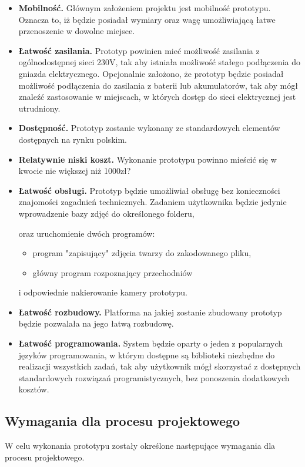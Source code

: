 \documentclass[a4paper,12pt,reqno]{article}
\begin{document}
\begin{itemize}
	\item \textbf{Mobilność.} Głównym założeniem projektu jest mobilność prototypu. Oznacza to, iż będzie posiadał wymiary oraz wagę umożliwiającą łatwe przenoszenie w dowolne miejsce.
	\item \textbf{Łatwość zasilania.} Prototyp powinien mieć możliwość zasilania z ogólnodostępnej sieci 230V, tak aby istniała możliwość stałego podłączenia do gniazda elektrycznego. Opcjonalnie założono, że prototyp będzie posiadał możliwość podłączenia do zasilania z baterii lub akumulatorów, tak aby mógł znaleźć zastosowanie w miejscach, w których dostęp do sieci elektrycznej jest utrudniony.
	\item \textbf{Dostępność.} Prototyp zostanie wykonany ze standardowych elementów dostępnych na rynku polskim.
	\item \textbf{Relatywnie niski koszt.} Wykonanie prototypu powinno mieścić się w kwocie nie większej niż \textcolor{to_check_at_end}{1000zł?}
	\item \textbf{Łatwość obsługi.} Prototyp będzie umożliwiał obsługę bez konieczności znajomości zagadnień technicznych. Zadaniem użytkownika będzie jedynie wprowadzenie bazy zdjęć do określonego folderu, \textcolor{new}{oraz uruchomienie dwóch programów:
		\begin{itemize}
			\item program "zapisujący" zdjęcia twarzy do zakodowanego pliku,
			\item główny program rozpoznający przechodniów
		\end{itemize}	
	}
	i odpowiednie nakierowanie kamery prototypu.
	\item \textbf{Łatwość rozbudowy.} Platforma na jakiej zostanie zbudowany prototyp będzie pozwalała na jego łatwą rozbudowę.
	\item \textbf{Łatwość programowania.} System będzie oparty o jeden z popularnych języków programowania, w którym dostępne są biblioteki niezbędne do realizacji wszystkich zadań, tak aby użytkownik mógł skorzystać z dostępnych standardowych rozwiązań programistycznych, bez ponoszenia dodatkowych kosztów.
\end{itemize}

\subsection{Wymagania dla procesu projektowego}

W celu wykonania prototypu zostały określone następujące wymagania dla procesu projektowego.
\end{document}
